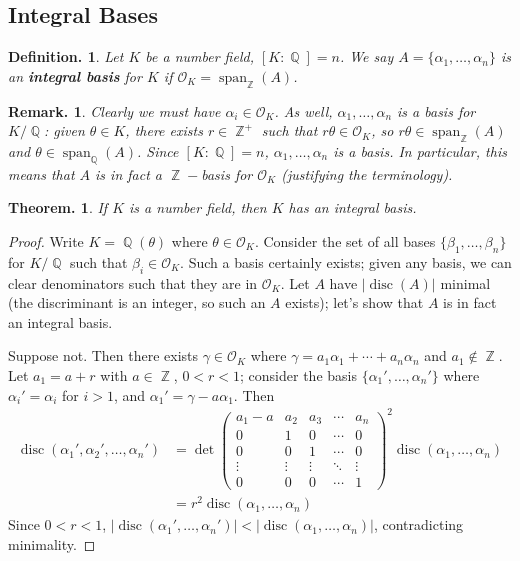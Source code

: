 \documentclass[11pt, a4paper]{memoir}
\DeclareMathOperator{\Q}{{\mathbb{Q}}}
\DeclareMathOperator{\Z}{{\mathbb{Z}}}
\theoremstyle{change}
\newtheorem{theorem}{Theorem.}[section]
\theoremstyle{plain}
\theoremstyle{nonumberplain}
\newtheorem{definition}{Definition.}
\newtheorem{remark}{Remark.}
\newtheorem{proof}{Proof}
\DeclareMathOperator{\disc}{disc}
\DeclareMathOperator{\spn}{span}
\begin{document}
\subsection{Integral Bases}
\begin{definition}
    Let $K$ be a number field, $[K:\Q]=n$.
    We say $A=\{\alpha_1,\ldots,\alpha_n\}$ is an \textbf{integral basis} for $K$ if $\mathcal{O}_K=\spn_{\Z}(A)$.
\end{definition}
\begin{remark}
    Clearly we must have $\alpha_i\in\mathcal{O}_K$.
    As well, $\alpha_1,\ldots,\alpha_n$ is a basis for $K/\Q$: given $\theta\in K$, there exists $r\in\Z^+$ such that $r\theta\in\mathcal{O}_K$, so $r\theta\in\spn_{\Z}(A)$ and $\theta\in\spn_{\Q}(A)$.
    Since $[K:\Q]=n$, $\alpha_1,\ldots,\alpha_n$ is a basis.
    In particular, this means that $A$ is in fact a $\Z-$basis for $\mathcal{O}_K$ (justifying the terminology).
\end{remark}
\begin{theorem}
    If $K$ is a number field, then $K$ has an integral basis.
\end{theorem}
\begin{proof}
    Write $K=\Q(\theta)$ where $\theta\in\mathcal{O}_K$.
    Consider the set of all bases $\{\beta_1,\ldots,\beta_n\}$ for $K/\Q$ such that $\beta_i\in\mathcal{O}_K$.
    Such a basis certainly exists; given any basis, we can clear denominators such that they are in $\mathcal{O}_K$.
    Let $A$ have $|\disc(A)|$ minimal (the discriminant is an integer, so such an $A$ exists); let's show that $A$ is in fact an integral basis.

    Suppose not.
    Then there exists $\gamma\in\mathcal{O}_K$ where $\gamma=a_1\alpha_1+\cdots+a_n\alpha_n$ and $a_1\notin\Z$.
    Let $a_1=a+r$ with $a\in\Z$, $0<r<1$; consider the basis $\{\alpha_1',\ldots,\alpha_n'\}$ where $\alpha_i'=\alpha_i$ for $i>1$, and $\alpha_1'=\gamma-a\alpha_1$.
    Then
    \begin{align*}
        \disc(\alpha_1',\alpha_2',\ldots,\alpha_n') &= \det
        \begin{pmatrix}
            a_1-a&a_2&a_3&\cdots&a_n\\
            0&1&0&\cdots&0\\
            0&0&1&\cdots&0\\
            \vdots&\vdots&\vdots&\ddots&\vdots\\
            0&0&0&\cdots&1
        \end{pmatrix}^2\disc(\alpha_1,\ldots,\alpha_n)\\
        &= r^2\disc(\alpha_1,\ldots,\alpha_n)
    \end{align*}
    Since $0<r<1$, $|\disc(\alpha_1',\ldots,\alpha_n')|<|\disc(\alpha_1,\ldots,\alpha_n)|$, contradicting minimality.
\end{proof}
\end{document}
